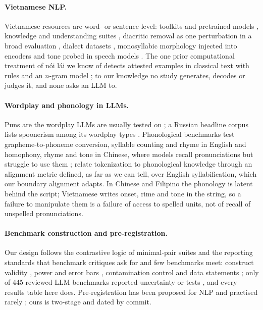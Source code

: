 \paragraph{Vietnamese NLP.}
Vietnamese resources are word- or sentence-level: toolkits and pretrained models \citep{N18-5012,2020-findings-emnlp-92,2022-naacl-srw-18,2311.02945}, knowledge and understanding suites \citep{2025-acl-long-563,2024-findings-naacl-261}, diacritic removal as one perturbation in a broad evaluation \citep{2024-findings-naacl-182}, dialect datasets \citep{2024-emnlp-main-426,2608.10414}, monosyllabic morphology injected into encoders \citep{2026-acl-long-472} and tone probed in speech models \citep{2024-naacl-long-239}. The one prior computational treatment of nói lái we know of detects attested examples in classical text with rules and an $n$-gram model \citep{Y18-1063}; to our knowledge no study generates, decodes or judges it, and none asks an LLM to.

\paragraph{Wordplay and phonology in LLMs.}
Puns are the wordplay LLMs are usually tested on \citep{S17-2005,2024-emnlp-main-657,2025-emnlp-main-1419}; a Russian headline corpus lists spoonerism among its wordplay types \citep{2025-ranlp-1-15}. Phonological benchmarks test grapheme-to-phoneme conversion, syllable counting and rhyme in English \citep{2024-knowllm-1-1} and homophony, rhyme and tone in Chinese, where models recall pronunciations but struggle to use them \citep{2026-acl-long-1041}; \citet{2026-acl-long-634} relate tokenization to phonological knowledge through an alignment metric defined, as far as we can tell, over English syllabification, which our boundary alignment adapts. In Chinese and Filipino the phonology is latent behind the script; Vietnamese writes onset, rime and tone in the string, so a failure to manipulate them is a failure of access to spelled units, not of recall of unspelled pronunciations.

\paragraph{Benchmark construction and pre-registration.}
Our design follows the contrastive logic of minimal-pair suites \citep{2020-tacl-1-25,P19-1116} and the reporting standards that benchmark critiques ask for and few benchmarks meet: construct validity \citep{2511.04703,2021-naacl-main-385}, power and error bars \citep{2020-emnlp-main-745,2411.00640,P18-1128}, contamination control \citep{2023-emnlp-main-308,2022-acl-short-18,2023-findings-emnlp-722} and data statements \citep{Q18-1041}; only  of 445 reviewed LLM benchmarks reported uncertainty or tests \citep{2511.04703}, and every results table here does. Pre-registration has been proposed for NLP \citep{2021-naacl-main-51} and practised rarely \citep{2024-lrec-main-809}; ours is two-stage and dated by commit.

